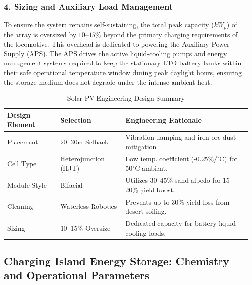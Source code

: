 \subsubsection*{4. Sizing and Auxiliary Load Management}To ensure the system remains self-sustaining, the total peak capacity ($kW_p$) of the array is oversized by $10$--$15\%$ beyond the primary charging requirements of the locomotive. This overhead is dedicated to powering the Auxiliary Power Supply (APS). The APS drives the active liquid-cooling pumps and energy management systems required to keep the stationary LTO battery banks within their safe operational temperature window during peak daylight hours, ensuring the storage medium does not degrade under the intense ambient heat.
\begin{table}[h!]

\centering

\caption{Solar PV Engineering Design Summary}

\label{table:pv_design}

\begin{tabular}{|l|l|l|}

\hline

\textbf{Design Element} & \textbf{Selection} & \textbf{Engineering Rationale} \\ \hline

Placement & 20--30m Setback & Vibration damping and iron-ore dust mitigation. \\ \hline

Cell Type & Heterojunction (HJT) & Low temp. coefficient (-0.25\%/$^\circ$C) for 50$^\circ$C ambient. \\ \hline

Module Style & Bifacial & Utilizes 30--45\% sand albedo for 15--20\% yield boost. \\ \hline

Cleaning & Waterless Robotics & Prevents up to 30\% yield loss from desert soiling. \\ \hline

Sizing & 10--15\% Oversize & Dedicated capacity for battery liquid-cooling loads. \\ \hline

\end{tabular}

\end{table}

\subsection{Charging Island Energy Storage: Chemistry and Operational Parameters}

